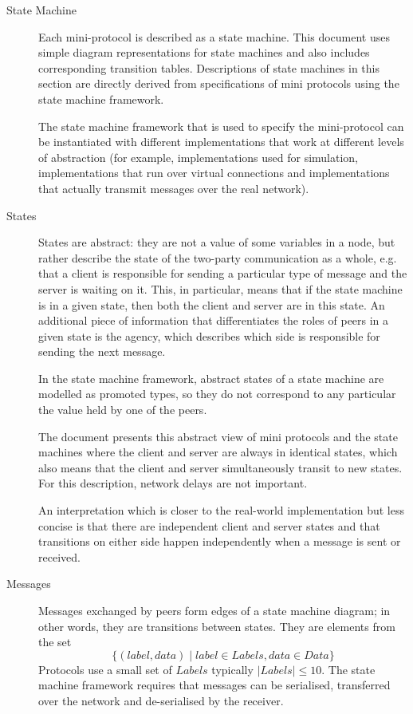 \begin{description}
\item[State Machine]
  Each mini-protocol is described as a state machine.
  This document uses simple diagram representations for state machines and
  also includes corresponding transition tables.
  Descriptions of state machines in this section are directly derived from
  specifications of mini protocols using the state machine framework.

  The state machine framework that is used to specify the mini-protocol can be instantiated
  with different implementations that work at different levels of abstraction
  (for example, implementations used for simulation, implementations that run over virtual
  connections and implementations that actually transmit messages over the real network).


\item[States]
  States are abstract: they are not a value of some variables in a node, but
  rather describe the state of the two-party communication as a whole, e.g.
  that a client is responsible for sending a particular type of message and
  the server is waiting on it.  This, in particular, means that if the state
  machine is in a given state, then both the client and server are in this state.
  An additional piece of information that differentiates the roles of peers in
  a given state is the agency, which describes which side is responsible for
  sending the next message.

  In the state machine framework, abstract states of a state machine are
  modelled as promoted types, so they do not correspond to any particular
  the value held by one of the peers.

  The document presents this abstract view of mini protocols and the state
  machines where the client and server are always in identical states, which
  also means that the client and server simultaneously transit to new states.
  For this description, network delays are not important.

  An interpretation which is closer to the real-world implementation but
  less concise is that there are independent client and server states
  and that transitions on either side happen independently when a message is sent or received.

\item[Messages]
  Messages exchanged by peers form edges of a state machine diagram; in other
  words, they are transitions between states.
  They are elements from the set
  $$\{(label, data) \mid label \in Labels, data \in Data\}$$
  Protocols use a small set of $Labels$ typically $|Labels| \leq 10$.
  The state machine framework requires that messages can be serialised,
  transferred over the network and de-serialised by the receiver.


\end{description}
